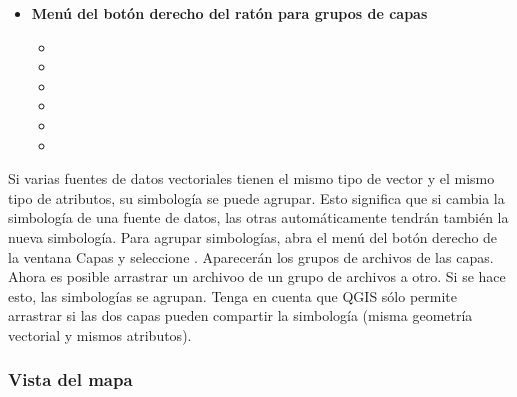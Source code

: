 \begin{itemize}
\item \textbf{Menú del botón derecho del ratón para grupos de capas} 
\begin{itemize}
\item {}
\item {}
\item {}
\item {}
\item {}
\item {}
\end{itemize}

\end{itemize}

Si varias fuentes de datos vectoriales tienen el mismo tipo de vector y el mismo tipo de atributos, su
simbología se puede agrupar. Esto significa que si cambia la simbología de una fuente de datos, 
las otras automáticamente tendrán también la nueva simbología. Para agrupar simbologías, abra 
el menú del botón derecho de la ventana Capas y seleccione . Aparecerán los 
grupos de archivos de las capas. Ahora es posible arrastrar un archivoo de un grupo de archivos a otro. Si se hace esto, 
las simbologías se agrupan. Tenga en cuenta que QGIS sólo permite arrastrar si las dos capas pueden compartir
la simbología (misma geometría vectorial y mismos atributos). 

%

\subsubsection{Vista del mapa}\label{label_mapview}

